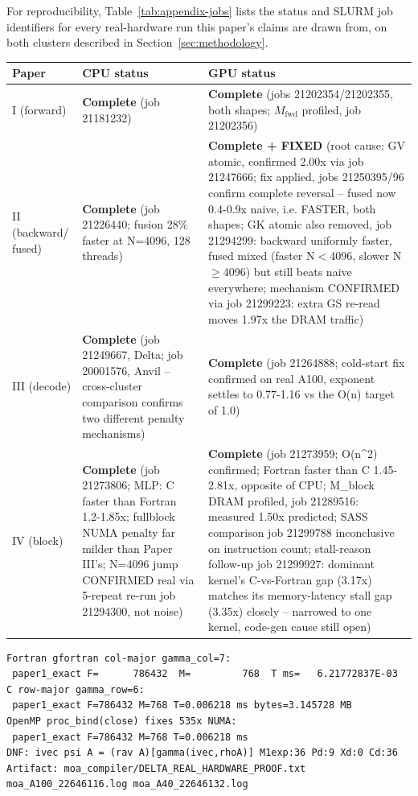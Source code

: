 \documentclass[11pt]{article}
\begin{document}
For reproducibility, Table~\ref{tab:appendix-jobs} lists the status and
SLURM job identifiers for every real-hardware run this paper's claims
are drawn from, on both clusters described in
Section~\ref{sec:methodology}.

\begin{center}
\begin{tabular}{@{}p{2.8cm}p{4.2cm}p{7.5cm}@{}}
\toprule
Paper & CPU status & GPU status \\
\midrule
I (forward) & \textbf{Complete} (job 21181232) & \textbf{Complete} (jobs 21202354/21202355, both shapes; $M_{\mathrm{fwd}}$ profiled, job 21202356) \\
II (backward/ fused) & \textbf{Complete} (job 21226440; fusion 28\% faster at N=4096, 128 threads) & \textbf{Complete + FIXED} (root cause: GV atomic, confirmed 2.00x via job 21247666; fix applied, jobs 21250395/96 confirm complete reversal -- fused now 0.4-0.9x naive, i.e. FASTER, both shapes; GK atomic also removed, job 21294299: backward uniformly faster, fused mixed (faster N$<$4096, slower N$\geq$4096) but still beats naive everywhere; mechanism CONFIRMED via job 21299223: extra GS re-read moves 1.97x the DRAM traffic) \\
III (decode) & \textbf{Complete} (job 21249667, Delta; job 20001576, Anvil -- cross-cluster comparison confirms two different penalty mechanisms) & \textbf{Complete} (job 21264888; cold-start fix confirmed on real A100, exponent settles to 0.77-1.16 vs the O(n) target of 1.0) \\
IV (block) & \textbf{Complete} (job 21273806; MLP: C faster than Fortran 1.2-1.85x; fullblock NUMA penalty far milder than Paper III's; N=4096 jump CONFIRMED real via 5-repeat re-run job 21294300, not noise) & \textbf{Complete} (job 21273959; O(n\textasciicircum{}2) confirmed; Fortran faster than C 1.45-2.81x, opposite of CPU; M\_block DRAM profiled, job 21289516: measured 1.50x predicted; SASS comparison job 21299788 inconclusive on instruction count; stall-reason follow-up job 21299927: dominant kernel's C-vs-Fortran gap (3.17x) matches its memory-latency stall gap (3.35x) closely -- narrowed to one kernel, code-gen cause still open) \\
\bottomrule
\end{tabular}
\label{tab:appendix-jobs}
\end{center}


\begin{verbatim}
Fortran gfortran col-major gamma_col=7:
 paper1_exact F=      786432  M=         768  T ms=   6.21772837E-03
C row-major gamma_row=6:
 paper1_exact F=786432 M=768 T=0.006218 ms bytes=3.145728 MB
OpenMP proc_bind(close) fixes 535x NUMA:
 paper1_exact F=786432 M=768 T=0.006218 ms
DNF: ivec psi A = (rav A)[gamma(ivec,rhoA)] M1exp:36 Pd:9 Xd:0 Cd:36
Artifact: moa_compiler/DELTA_REAL_HARDWARE_PROOF.txt moa_A100_22646116.log moa_A40_22646132.log
\end{verbatim}
\end{document}
